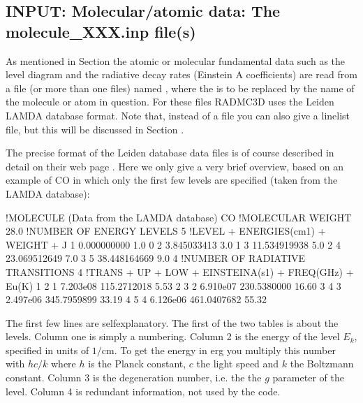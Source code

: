 \documentclass[letterpaper,10pt,english]{sphinxmanual}
\begin{document}
\subsection{INPUT: Molecular/atomic data: The molecule\_XXX.inp file(s)}
\label{\detokenize{lineradtrans:input-molecular-atomic-data-the-molecule-xxx-inp-file-s}}\label{\detokenize{lineradtrans:sec-leiden-format}}\label{\detokenize{lineradtrans:sec-molecule-xxx-inp}}
As mentioned in Section {\hyperref[\detokenize{lineradtrans:sec-line-dot-inp}]{}} the atomic or molecular
fundamental data such as the level diagram and the radiative decay rates
(Einstein A coefficients) are read from a file (or more than one files) named
, where the  is to be replaced by the name of the
molecule or atom in question. For these files RADMC\sphinxhyphen{}3D uses the Leiden LAMDA
database format. Note that, instead of a  file you can also
give a linelist file, but this will be discussed in Section
{\hyperref[\detokenize{lineradtrans:sec-linelist-xxx-inp}]{}}.

The precise format of the Leiden database data files is of course described
in detail on their web
page  . Here we only
give a very brief overview, based on an example of CO in which only the
first few levels are specified (taken from the LAMDA database):

\begin{sphinxVerbatim}[commandchars=\\\{\}]
!MOLECULE (Data from the LAMDA database)
CO
!MOLECULAR WEIGHT
28.0
!NUMBER OF ENERGY LEVELS
5
!LEVEL + ENERGIES(cm\PYGZca{}\PYGZhy{}1) + WEIGHT + J
    1     0.000000000  1.0     0
    2     3.845033413  3.0     1
    3    11.534919938  5.0     2
    4    23.069512649  7.0     3
    5    38.448164669  9.0     4
!NUMBER OF RADIATIVE TRANSITIONS
4
!TRANS + UP + LOW + EINSTEINA(s\PYGZca{}\PYGZhy{}1) + FREQ(GHz) + E\PYGZus{}u(K)
    1     2     1   7.203e\PYGZhy{}08     115.2712018      5.53
    2     3     2   6.910e\PYGZhy{}07     230.5380000     16.60
    3     4     3   2.497e\PYGZhy{}06     345.7959899     33.19
    4     5     4   6.126e\PYGZhy{}06     461.0407682     55.32
\end{sphinxVerbatim}

The first few lines are self\sphinxhyphen{}explanatory. The first of the two tables is about
the levels. Column one is simply a numbering. Column 2 is the energy of the
level \(E_k\), specified in units of \(1/\mathrm{cm}\). To get the energy in erg
you multiply this number with \(hc/k\) where \(h\) is the Planck
constant, \(c\) the light speed and \(k\) the Boltzmann constant. Column
3 is the degeneration number, i.e. the the \(g\) parameter of the
level. Column 4 is redundant information, not used by the code.
\end{document}
